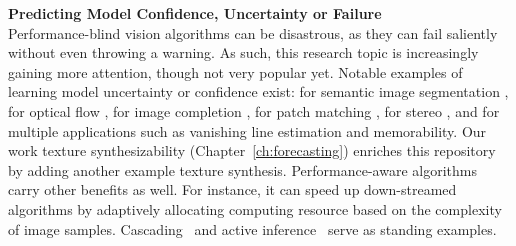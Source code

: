 \textbf{Predicting Model Confidence, Uncertainty or Failure}  \\
Performance-blind vision algorithms can be disastrous, as they can fail saliently without even throwing a warning. 
As such, this research topic is increasingly gaining more attention, though not very popular yet. Notable examples of learning model uncertainty or confidence exist: for       
semantic image segmentation \citep{kendall2015bayesian}, for  optical flow \citep{confidence:of:08, flow:confidence},  for image completion \citep{completion:quality},  for patch matching \citep{matchability}, for stereo \citep{stereo:confidence}, and  for multiple applications \citep{zhang2014predicting} such as vanishing line estimation and memorability.  Our work texture synthesizability (Chapter~\ref{ch:forecasting}) enriches this repository by adding another example texture synthesis. 
Performance-aware algorithms carry other benefits as well. For instance, it can speed up down-streamed algorithms by adaptively allocating computing resource based on the complexity of image samples.  Cascading~\citep{cascaded:01, felzenszwalb2010cascade} and active inference~\citep{liu2015multiclass} serve as standing examples. 

%   

